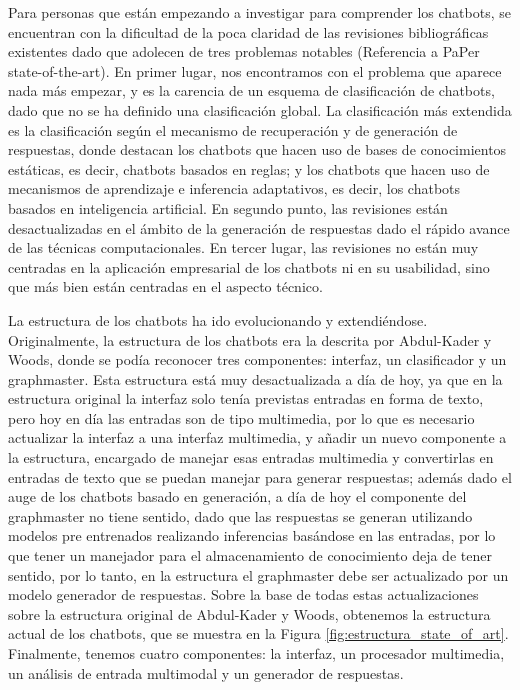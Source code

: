 Para personas que están empezando a investigar para comprender los chatbots, se encuentran con la dificultad de la poca claridad de las revisiones bibliográficas existentes dado que adolecen de tres problemas notables (Referencia a PaPer state-of-the-art). En primer lugar, nos encontramos con el problema que aparece nada más empezar, y es la carencia de un esquema de clasificación de chatbots, dado que no se ha definido una clasificación global. La clasificación más extendida es la clasificación según el mecanismo de recuperación y de generación de respuestas, donde destacan los chatbots que hacen uso de bases de conocimientos estáticas, es decir, chatbots basados en reglas; y los chatbots que hacen uso de mecanismos de aprendizaje e inferencia adaptativos, es decir, los chatbots basados en inteligencia artificial. En segundo punto, las revisiones están desactualizadas en el ámbito de la generación de respuestas dado el rápido avance de las técnicas computacionales. En tercer lugar, las revisiones no están muy centradas en la aplicación empresarial de los chatbots ni en su usabilidad, sino que más bien están centradas en el aspecto técnico.

La estructura de los chatbots ha ido evolucionando y extendiéndose. Originalmente, la estructura de los chatbots era la descrita por Abdul-Kader y Woods, donde se podía reconocer tres componentes: interfaz, un clasificador y un graphmaster. Esta estructura está muy desactualizada a día de hoy, ya que en la estructura original la interfaz solo tenía previstas entradas en forma de texto, pero hoy en día las entradas son de tipo multimedia, por lo que es necesario actualizar la interfaz a una interfaz multimedia, y añadir un nuevo componente a la estructura, encargado de manejar esas entradas multimedia y convertirlas en entradas de texto que se puedan manejar para generar respuestas; además dado el auge de los chatbots basado en generación, a día de hoy el componente del graphmaster no tiene sentido, dado que las respuestas se generan utilizando modelos pre entrenados realizando inferencias basándose en las entradas, por lo que tener un manejador para el almacenamiento de conocimiento deja de tener sentido, por lo tanto, en la estructura el graphmaster debe ser actualizado por un modelo generador de respuestas. Sobre la base de todas estas actualizaciones sobre la estructura original de Abdul-Kader y Woods, obtenemos la estructura actual de los chatbots, que se muestra en la Figura \ref{fig:estructura_state_of_art}. Finalmente, tenemos cuatro componentes: la interfaz, un procesador multimedia, un análisis de entrada multimodal y un generador de respuestas.

